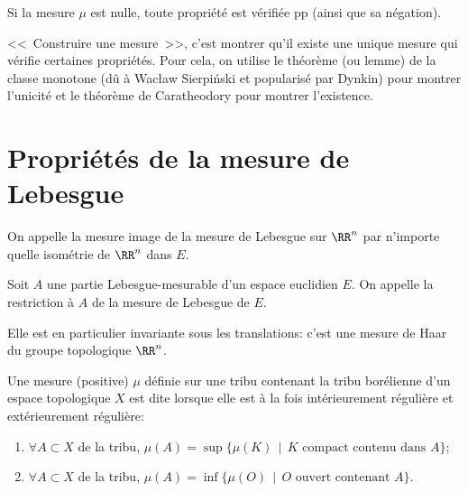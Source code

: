 Si la mesure $\mu$ est nulle, toute propriété est vérifiée pp (ainsi que sa négation).

\medskip
{}
<<~Construire une mesure~>>, c'est montrer qu'il existe une unique mesure qui vérifie certaines propriétés. 
Pour cela, on utilise le théorème (ou lemme) de la classe monotone (dû à Wacław Sierpiński 
et popularisé par Dynkin) pour montrer l'unicité et le 
théorème de Caratheodory pour montrer l'existence.

\section{Propriétés de la mesure de Lebesgue}

On appelle 
la mesure image de la mesure de Lebesgue
sur $\RR^n$ par n'importe quelle isométrie de $\RR^n$ dans $E$.

Soit $A$ une partie Lebesgue-mesurable d'un espace euclidien $E$.
On appelle  la restriction à $A$ de la mesure de Lebesgue de $E$.

\begin{theoreme}
Elle est en particulier invariante sous les translations: c'est une mesure de Haar 
du groupe topologique $\RR^n$.
\end{theoreme}


\begin{definition}
Une mesure (positive) $\mu$ définie sur une tribu contenant la tribu borélienne d'un espace
topologique $X$ est dite  lorsque elle est
à la fois intérieurement régulière et extérieurement régulière:
\begin{enumerate}
   \item $\forall A\subset X$ de la tribu, $\mu(A)=\sup\{\mu(K)\,\mid\, K \text{ compact contenu dans } A\} $;
   \item $\forall A\subset X$ de la tribu, $\mu(A)=\inf\{\mu(O)\,\mid\, O \text{ ouvert contenant } A\}$.
\end{enumerate}
\end{definition}

